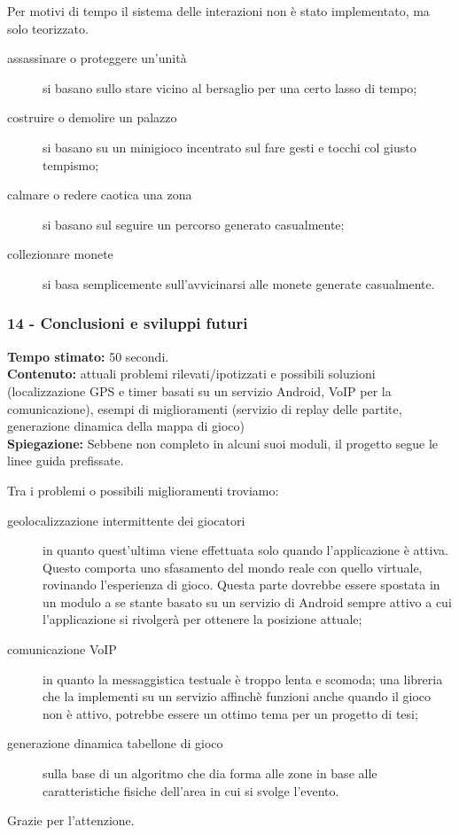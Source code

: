 \documentclass[
	twoside]				%
	{toptesi}				%
\begin{document}
	Per motivi di tempo il sistema delle interazioni non è stato implementato, ma solo teorizzato.
	
	\begin{description}
		\item[assassinare o proteggere un'unità] si basano sullo stare vicino al bersaglio per una certo lasso di tempo;
		\item[costruire o demolire un palazzo] si basano su un minigioco incentrato sul fare gesti e tocchi col giusto tempismo;
		\item[calmare o redere caotica una zona] si basano sul seguire un percorso generato casualmente;
		\item[collezionare monete] si basa semplicemente sull'avvicinarsi alle monete generate casualmente.
	\end{description}
	
	\subsubsection{14 - Conclusioni e sviluppi futuri}
	
	\textbf{Tempo stimato:} 50 secondi. \\
	
	\textbf{Contenuto:} attuali problemi rilevati/ipotizzati e possibili soluzioni (localizzazione GPS e timer basati su un servizio Android, VoIP per la comunicazione), esempi di miglioramenti (servizio di replay delle partite, generazione dinamica della mappa di gioco) \\
	
	\textbf{Spiegazione:} Sebbene non completo in alcuni suoi moduli, il progetto segue le linee guida prefissate.
	
	Tra i problemi o possibili miglioramenti troviamo:
	
	\begin{description}
		\item[geolocalizzazione intermittente dei giocatori] in quanto quest'ultima viene effettuata solo quando l'applicazione è attiva. Questo comporta uno sfasamento del mondo reale con quello virtuale, rovinando l'esperienza di gioco. Questa parte dovrebbe essere spostata in un modulo a se stante basato su un servizio di Android sempre attivo a cui l'applicazione si rivolgerà per ottenere la posizione attuale;
		\item[comunicazione VoIP] in quanto la messaggistica testuale è troppo lenta e scomoda; una libreria che la implementi su un servizio affinchè funzioni anche quando il gioco non è attivo, potrebbe essere un ottimo tema per un progetto di tesi;
		\item[generazione dinamica tabellone di gioco] sulla base di un algoritmo che dia forma alle zone in base alle caratteristiche fisiche dell'area in cui si svolge l'evento.
	\end{description}
	
	Grazie per l'attenzione.
	
\end{document}
